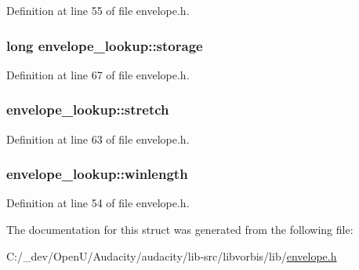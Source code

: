 Definition at line 55 of file envelope.\+h.

\subsubsection[{\texorpdfstring{storage}{storage}}]{\setlength{\rightskip}{0pt plus 5cm}long envelope\+\_\+lookup\+::storage}\hypertarget{structenvelope__lookup_aab813e353366d427ac743660ad963f9d}{}\label{structenvelope__lookup_aab813e353366d427ac743660ad963f9d}


Definition at line 67 of file envelope.\+h.

\subsubsection[{\texorpdfstring{stretch}{stretch}}]{ envelope\+\_\+lookup\+::stretch}\hypertarget{structenvelope__lookup_af12cc9298483d0d8a8d271d4f24b3ee7}{}\label{structenvelope__lookup_af12cc9298483d0d8a8d271d4f24b3ee7}


Definition at line 63 of file envelope.\+h.

\subsubsection[{\texorpdfstring{winlength}{winlength}}]{ envelope\+\_\+lookup\+::winlength}\hypertarget{structenvelope__lookup_a0dd3e4be45e14a1f562774245db3ba80}{}\label{structenvelope__lookup_a0dd3e4be45e14a1f562774245db3ba80}


Definition at line 54 of file envelope.\+h.



The documentation for this struct was generated from the following file\+:\begin{DoxyCompactItemize}
\item 
C\+:/\+\_\+dev/\+Open\+U/\+Audacity/audacity/lib-\/src/libvorbis/lib/\hyperlink{lib-src_2libvorbis_2lib_2_envelope_8h}{envelope.\+h}\end{DoxyCompactItemize}
